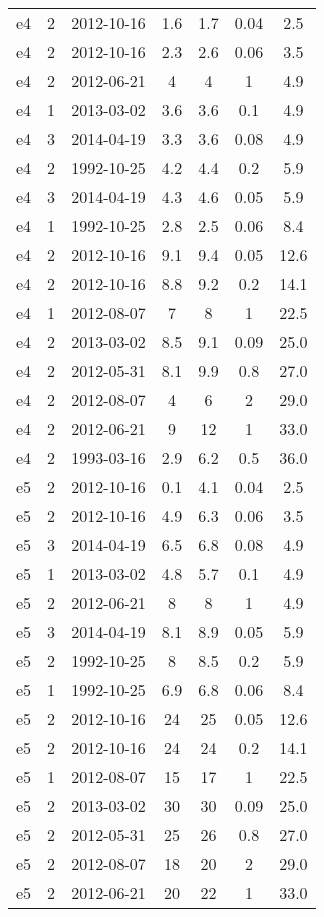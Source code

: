 \begin{table*}[htp]
\begin{tabular}{ccccccc}
e4 & 2 & 2012-10-16 & 1.6 & 1.7 & 0.04 & 2.5 \\
e4 & 2 & 2012-10-16 & 2.3 & 2.6 & 0.06 & 3.5 \\
e4 & 2 & 2012-06-21 & 4 & 4 & 1 & 4.9 \\
e4 & 1 & 2013-03-02 & 3.6 & 3.6 & 0.1 & 4.9 \\
e4 & 3 & 2014-04-19 & 3.3 & 3.6 & 0.08 & 4.9 \\
e4 & 2 & 1992-10-25 & 4.2 & 4.4 & 0.2 & 5.9 \\
e4 & 3 & 2014-04-19 & 4.3 & 4.6 & 0.05 & 5.9 \\
e4 & 1 & 1992-10-25 & 2.8 & 2.5 & 0.06 & 8.4 \\
e4 & 2 & 2012-10-16 & 9.1 & 9.4 & 0.05 & 12.6 \\
e4 & 2 & 2012-10-16 & 8.8 & 9.2 & 0.2 & 14.1 \\
e4 & 1 & 2012-08-07 & 7 & 8 & 1 & 22.5 \\
e4 & 2 & 2013-03-02 & 8.5 & 9.1 & 0.09 & 25.0 \\
e4 & 2 & 2012-05-31 & 8.1 & 9.9 & 0.8 & 27.0 \\
e4 & 2 & 2012-08-07 & 4 & 6 & 2 & 29.0 \\
e4 & 2 & 2012-06-21 & 9 & 12 & 1 & 33.0 \\
e4 & 2 & 1993-03-16 & 2.9 & 6.2 & 0.5 & 36.0 \\
e5 & 2 & 2012-10-16 & 0.1 & 4.1 & 0.04 & 2.5 \\
e5 & 2 & 2012-10-16 & 4.9 & 6.3 & 0.06 & 3.5 \\
e5 & 3 & 2014-04-19 & 6.5 & 6.8 & 0.08 & 4.9 \\
e5 & 1 & 2013-03-02 & 4.8 & 5.7 & 0.1 & 4.9 \\
e5 & 2 & 2012-06-21 & 8 & 8 & 1 & 4.9 \\
e5 & 3 & 2014-04-19 & 8.1 & 8.9 & 0.05 & 5.9 \\
e5 & 2 & 1992-10-25 & 8 & 8.5 & 0.2 & 5.9 \\
e5 & 1 & 1992-10-25 & 6.9 & 6.8 & 0.06 & 8.4 \\
e5 & 2 & 2012-10-16 & 24 & 25 & 0.05 & 12.6 \\
e5 & 2 & 2012-10-16 & 24 & 24 & 0.2 & 14.1 \\
e5 & 1 & 2012-08-07 & 15 & 17 & 1 & 22.5 \\
e5 & 2 & 2013-03-02 & 30 & 30 & 0.09 & 25.0 \\
e5 & 2 & 2012-05-31 & 25 & 26 & 0.8 & 27.0 \\
e5 & 2 & 2012-08-07 & 18 & 20 & 2 & 29.0 \\
e5 & 2 & 2012-06-21 & 20 & 22 & 1 & 33.0 \\

\end{tabular}
\end{table*}
